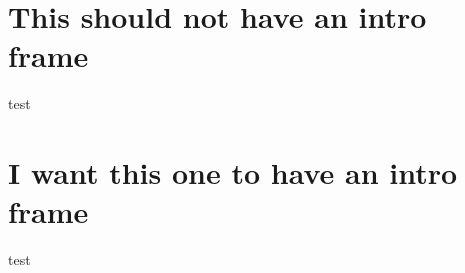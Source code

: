 \documentclass[10pt]{beamer}
\begin{document}
{
\section{This should not have an intro frame}
}

\begin{frame}
    test
\end{frame}

\section{I want this one to have an intro frame}

\begin{frame}
    test
\end{frame}
\end{document}
